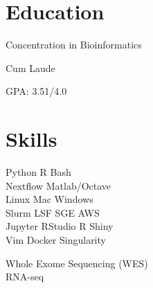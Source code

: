 
\begin{minipage}[t]{0.33\textwidth} %

\section{Education} 

\vspace{\topsep} %
\vspace{1pt}
\begin{tightitemize}
\item Concentration in Bioinformatics
\item Cum Laude
\item GPA: 3.51/4.0
\end{tightitemize}
\vspace{3pt}

\section{Skills}

Python \textbullet{} R \textbullet{}  Bash \\ 
Nextflow \textbullet{} Matlab/Octave \\
Linux \textbullet{} Mac \textbullet{} Windows\\
Slurm \textbullet{} LSF \textbullet{} SGE \textbullet{} AWS \\

Jupyter \textbullet{} RStudio  \textbullet{} R Shiny\\
Vim \textbullet{} Docker \textbullet{} Singularity \\
\sectionspace %

Whole Exome Sequencing (WES) \\
RNA-seq \\


\end{minipage}
